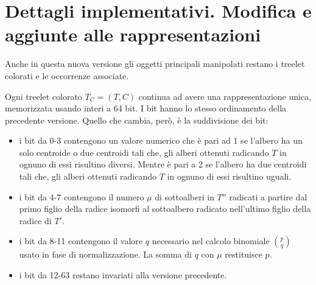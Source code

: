 \section{Dettagli implementativi. Modifica e aggiunte alle rappresentazioni}
\label{cap 3:3}
Anche in questa nuova versione gli oggetti principali manipolati restano i treelet colorati e le occorrenze associate.

Ogni treelet colorato $ T_C = (T,C)$ continua ad avere una rappresentazione unica, memorizzata usando interi a 64 bit.
I bit hanno lo stesso ordinamento della precedente versione.
Quello che cambia, per\`o, \`e la suddivisione dei bit:
\begin{itemize}
	\item i bit da 0-3 contengono un valore numerico che \`e pari ad 1 se l'albero ha un solo centroide o due centroidi tali che, gli alberi ottenuti radicando $ T $ in ognuno di essi risultino diversi.
	Mentre \`e pari a  2 se l'albero ha due centroidi tali che, gli alberi ottenuti radicando $ T $ in ognuno di essi risultino uguali.
	\item  i bit da 4-7 contengono il numero $\mu$ di sottoalberi in $ T'' $ radicati a partire dal primo figlio della radice isomorfi al sottoalbero radicato nell'ultimo figlio della radice di $ T' $.
	\item i bit da 8-11 contengono il valore $ q $ necessario nel calcolo binomiale $ \binom{p}{q} $ usato in fase di normalizzazione.
	La somma di $ q $ con $\mu$ restituisce $ p $.
	\item i bit da 12-63 restano invariati alla versione precedente.	  
\end{itemize} 

